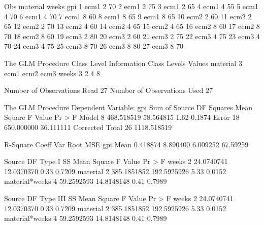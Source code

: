 \documentclass{article}
\begin{document}
\begin{Woutput}
Obs    material    weeks    gpi
  1      ecm1        2       70
  2      ecm1        2       75
  3      ecm1        2       65
  4      ecm1        4       55
  5      ecm1        4       70
  6      ecm1        4       70
  7      ecm1        8       60
  8      ecm1        8       65
  9      ecm1        8       65
 10      ecm2        2       60
 11      ecm2        2       65
 12      ecm2        2       70
 13      ecm2        4       60
 14      ecm2        4       65
 15      ecm2        4       65
 16      ecm2        8       60
 17      ecm2        8       70
 18      ecm2        8       60
 19      ecm3        2       80
 20      ecm3        2       60
 21      ecm3        2       75
 22      ecm3        4       75
 23      ecm3        4       70
 24      ecm3        4       75
 25      ecm3        8       70
 26      ecm3        8       80
 27      ecm3        8       70

The GLM Procedure
        Class Level Information
Class         Levels    Values
material           3    ecm1 ecm2 ecm3
weeks              3    2 4 8

Number of Observations Read          27
Number of Observations Used          27

The GLM Procedure
Dependent Variable: gpi
                                        Sum of
Source                      DF         Squares     Mean Square    F Value    Pr > F
Model                        8      468.518519       58.564815       1.62    0.1874
Error                       18      650.000000       36.111111
Corrected Total             26     1118.518519

R-Square     Coeff Var      Root MSE      gpi Mean
0.418874      8.890400      6.009252      67.59259

Source                      DF       Type I SS     Mean Square    F Value    Pr > F
weeks                        2      24.0740741      12.0370370       0.33    0.7209
material                     2     385.1851852     192.5925926       5.33    0.0152
material*weeks               4      59.2592593      14.8148148       0.41    0.7989

Source                      DF     Type III SS     Mean Square    F Value    Pr > F
weeks                        2      24.0740741      12.0370370       0.33    0.7209
material                     2     385.1851852     192.5925926       5.33    0.0152
material*weeks               4      59.2592593      14.8148148       0.41    0.7989


\end{Woutput}
\end{document}
